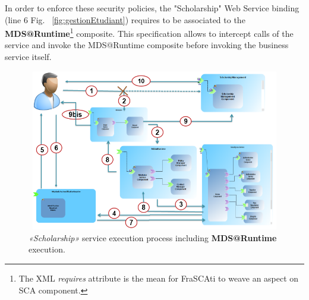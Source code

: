 \documentclass[runningheads,a4paper]{llncs}
\begin{document}
In order to enforce these security policies, the "Scholarship"  Web Service binding (line 6 Fig. ~\ref{fig:gestionEtudiant}) requires to be associated to the \textbf{MDS@Runtime}\footnote{The XML \emph{requires} attribute is the mean for FraSCAti to weave an aspect on SCA component.} composite. This specification allows to intercept calls of the service and invoke the  MDS@Runtime composite before invoking the business service itself.
\begin{figure} 
\center
\includegraphics[height=200pt, width=320pt]{process.png}
\caption{\emph{«Scholarship»} service execution process including   \textbf{MDS@Runtime} execution.}
\label{fig:process}
\end{figure}
\end{document}
